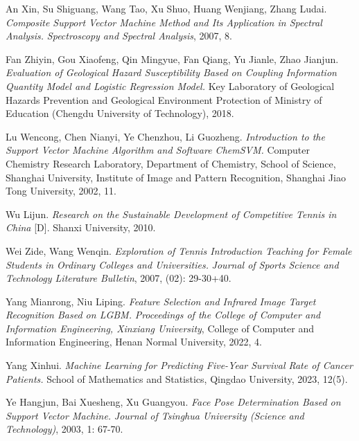 \documentclass[12pt]{article}
\begin{document}
\begin{thebibliography}{9}

    \item An Xin, Su Shiguang, Wang Tao, Xu Shuo, Huang Wenjiang, Zhang Ludai. \emph{Composite Support Vector Machine Method and Its Application in Spectral Analysis.} \emph{Spectroscopy and Spectral Analysis}, 2007, 8.

    \item Fan Zhiyin, Gou Xiaofeng, Qin Mingyue, Fan Qiang, Yu Jianle, Zhao Jianjun. \emph{Evaluation of Geological Hazard Susceptibility Based on Coupling Information Quantity Model and Logistic Regression Model.} Key Laboratory of Geological Hazards Prevention and Geological Environment Protection of Ministry of Education (Chengdu University of Technology), 2018.

    \item Lu Wencong, Chen Nianyi, Ye Chenzhou, Li Guozheng. \emph{Introduction to the Support Vector Machine Algorithm and Software ChemSVM.} Computer Chemistry Research Laboratory, Department of Chemistry, School of Science, Shanghai University, Institute of Image and Pattern Recognition, Shanghai Jiao Tong University, 2002, 11.

    \item Wu Lijun. \emph{Research on the Sustainable Development of Competitive Tennis in China} [D]. Shanxi University, 2010.

    \item Wei Zide, Wang Wenqin. \emph{Exploration of Tennis Introduction Teaching for Female Students in Ordinary Colleges and Universities.} \emph{Journal of Sports Science and Technology Literature Bulletin}, 2007, (02): 29-30+40.

    \item Yang Mianrong, Niu Liping. \emph{Feature Selection and Infrared Image Target Recognition Based on LGBM.} \emph{Proceedings of the College of Computer and Information Engineering, Xinxiang University}, College of Computer and Information Engineering, Henan Normal University, 2022, 4.

    \item Yang Xinhui. \emph{Machine Learning for Predicting Five-Year Survival Rate of Cancer Patients.} School of Mathematics and Statistics, Qingdao University, 2023, 12(5).

    \item Ye Hangjun, Bai Xuesheng, Xu Guangyou. \emph{Face Pose Determination Based on Support Vector Machine.} \emph{Journal of Tsinghua University (Science and Technology)}, 2003, 1: 67-70.

\end{thebibliography}
\end{document}

